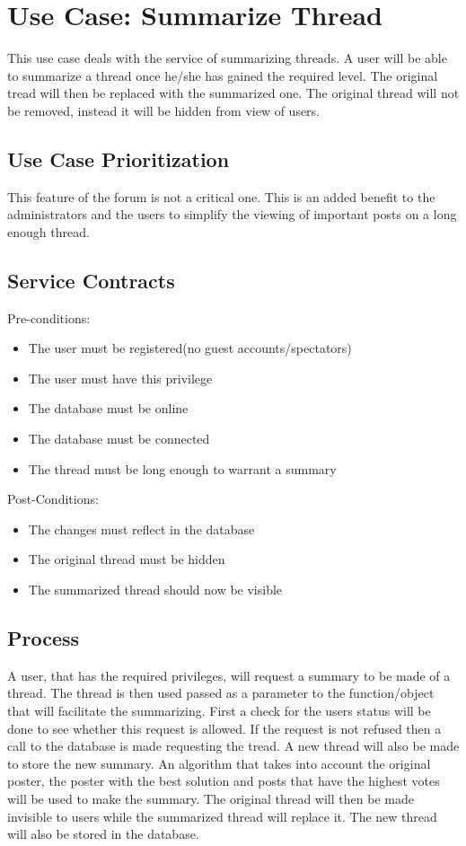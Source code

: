 \documentclass[a4paper,12pt]{article}
\begin{document}
\section{Use Case: Summarize Thread}
This use case deals with the service of summarizing threads. A user will be able to summarize a thread once he/she has gained the required level. The original tread will then be replaced with the summarized one. The original thread will not be removed, instead it will be hidden from view of users.
    
    
\subsection{Use Case Prioritization}
This feature of the forum is not a critical one. This is an added benefit to the administrators and the users to simplify the viewing of important posts on a long enough thread.
      
\subsection{Service Contracts}
Pre-conditions: 
\begin{itemize}
\item The user must be registered(no guest accounts/spectators)
\item The user must have this privilege
\item The database must be online
\item The database must be connected
\item The thread must be long enough to warrant a summary
\end{itemize}
      
Post-Conditions:
\begin{itemize}
\item The changes must reflect in the database
\item The original thread must be hidden
\item The summarized thread should now be visible
\end{itemize}
      
\subsection{Process}
A user, that has the required privileges, will request a summary to be made of a thread. The thread is then used passed as a parameter to the function/object that will facilitate the summarizing. First a check for the users status will be done to see whether this request is allowed. If the request is not refused then a call to the database is made requesting the tread. A new thread will also be made to store the new summary. An algorithm that takes into account the original poster, the poster with the best solution and posts that have the highest votes will be used to make the summary. The original thread will then be made invisible to users while the summarized thread will replace it. The new thread will also be stored in the database.
\end{document}
